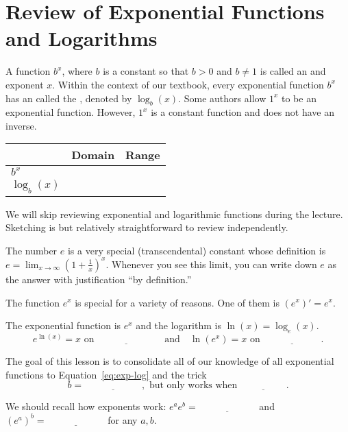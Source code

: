 \documentclass[../main.tex]{subfiles}
\begin{document}
 \section{Review of Exponential Functions and Logarithms}
  A function \(b^{x}\), where \(b\) is a constant so that \(b > 0\) and \(b \ne 1\) is called an  and exponent \(x\). Within the context of our textbook, every exponential function \(b^{x}\) has an  called the , denoted by \(\log_{b}(x)\). \newline
  {\scriptsize Some authors allow \(1^{x}\) to be an exponential function. However, \(1^{x}\) is a constant function and does not have an inverse.}

  \begin{center}
    \begin{tabular}{l|p{1in}|p{1in}}
    & Domain & Range \\\midrule
      \(b^{x}\) & & \\\midrule
      \(\log_{b}(x)\) & &
    \end{tabular}
  \end{center}

  \faExclamationTriangle{} We will skip reviewing  exponential and logarithmic functions during the lecture. Sketching is  but relatively straightforward to review independently.


  The number \(e\) is a very special (transcendental) constant whose definition is \(e = \lim_{x \to \infty} \left( 1 + \frac{1}{x} \right)^{x}\). Whenever you see this limit, you can write down \(e\) as the answer with justification ``by definition.''
  \bigskip

  The function \(e^{x}\) is special for a variety of reasons. One of them is \((e^{x})' = e^{x}\).
  \begin{mdframed}[style=simple]
    The  exponential function is \(e^{x}\) and the  logarithm is \(\ln(x) = \log_{e}(x)\).
    \begin{equation} \label{eq:exp-log}
      e^{\ln(x)} = x \text{ on } \underline{\hspace{1in}} \quad\text{and}\quad \ln(e^{x}) = x \text{ on } \underline{\hspace{1in}}.
    \end{equation}

    The goal of this lesson is to consolidate all of our knowledge of all exponential functions to Equation~\eqref{eq:exp-log} and the  trick
    \begin{equation} \label{eq:exp-change-of-base}
      b = \underline{\hspace{1in}}, \text{ but only works when } \underline{\hspace{2cm}}.
    \end{equation}
  \end{mdframed}
  We should recall how exponents work: \(e^{a}e^{b} = \underline{\hspace{1in}}\) and \((e^{a})^{b} = \underline{\hspace{1in}}\) for any \(a,b\).
\end{document}
